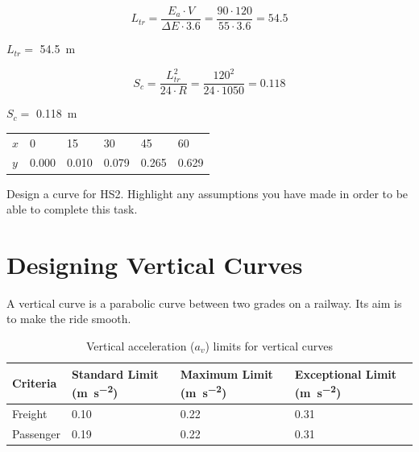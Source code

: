 \documentclass{bcrre_exam}
\begin{document}
\begin{questions}
\begin{solution}
\begin{equation}
    L_{tr} = \frac{E_a \cdot V}{\Delta E \cdot 3.6} = \frac{90 \cdot 120}{55 \cdot 3.6} = 54.5
\end{equation}

$L_{tr}=$ \qty{54.5}{m}

\begin{equation}
    S_c=\frac{L_{tr}^2}{24 \cdot R} = \frac{120^2}{24 \cdot 1050} = 0.118
\end{equation}

$S_c=$ \qty{0.118}{m}

\vspace{1cm}

\begin{tabular}{@{}llllll@{}}
\toprule
$x$ & \num{0}     & \num{15}    & \num{30}    & \num{45}    & \num{60}    \\ 
$y$ & \num{0.000} & \num{0.010} & \num{0.079} & \num{0.265} & \num{0.629} \\ \bottomrule
\end{tabular}

\end{solution}

\question Design a curve for HS2. Highlight any assumptions you have made in order to be able to complete this task. 

\end{questions}

\newpage
\section{Designing Vertical Curves}

A vertical curve is a parabolic curve between two grades on a railway. Its aim is to make the ride smooth.

\begin{table}[h]
\centering
\caption{Vertical acceleration ($a_v$) limits for vertical curves}
\label{tab:vert-acc-limits}
\begin{tabular}{@{}llll@{}}
\toprule
Criteria  & Standard Limit (\unit{\meter \per \second \squared}) & Maximum Limit (\unit{\meter \per \second \squared}) & Exceptional Limit (\unit{\meter \per \second \squared}) \\ \midrule
Freight   & \num{0.10} & \num{0.22} & \num{0.31} \\
Passenger & \num{0.19} & \num{0.22} & \num{0.31} \\ \bottomrule
\end{tabular}
\end{table}
\end{document}
